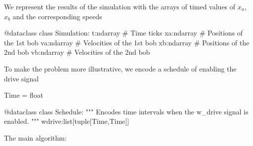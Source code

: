 We represent the results of the simulation with the arrays of timed values of $x_a$, $x_b$ and the
corresponding speeds

  \begin{python}
  @dataclass
  class Simulation:
    t:ndarray   # Time ticks
    xa:ndarray  # Positions of the 1st bob
    va:ndarray  # Velocities of the 1st bob
    xb:ndarray  # Positions of the 2nd bob
    vb:ndarray  # Velocities of the 2nd bob
  \end{python}

To make the problem more illustrative, we encode a schedule of enabling the drive signal

  \begin{comment}
    \begin{sh}
    printf '\\begin{%
    cat $PROJECT_ROOT/python/mechanical_bloch.py | sedlines.sh Schedule
    printf '\\end{%
    \end{sh}
  \end{comment}

  \begin{python}
  Time = float

  @dataclass
  class Schedule:
    """ Encodes time intervals when the w_drive signal is enabled. """
    wdrive:list[tuple[Time,Time]]
  \end{python}


The main algorithm:

